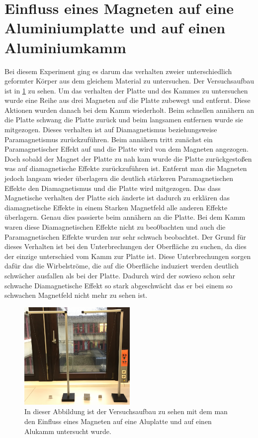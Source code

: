 \section{Einfluss eines Magneten auf eine Aluminiumplatte und auf einen Aluminiumkamm }\label{kap:Kamm_Platte}
Bei diesem Experiment ging es darum das verhalten zweier unterschiedlich geformter Körper aus dem gleichem Material zu untersuchen. Der Versuchsaufbau ist in \cref{fig:Alukamm} zu sehen.
Um das verhalten der Platte und des Kammes zu untersuchen wurde eine Reihe aus drei Magneten  auf die Platte zubewegt und entfernt. Diese Aktionen wurden danach bei dem Kamm wiederholt.
Beim schnellen annähern an die Platte schwang die Platte zurück und beim langsamen entfernen wurde sie mitgezogen.
Dieses verhalten ist auf Diamagnetismus beziehungsweise Paramagnetismus zurückzuführen. Beim annähern tritt zunächst ein Paramagnetischer Effekt auf und die Platte wird von dem Magneten angezogen. Doch sobald der Magnet der Platte zu nah kam wurde die Platte zurückgestoßen was auf diamagnetische Effekte zurückzuführen ist. Entfernt man die Magneten jedoch langsam wieder überlagern die deutlich stärkeren Paramagnetischen Effekte den Diamagnetismus und die Platte wird mitgezogen.
Das dass Magnetische verhalten der Platte sich änderte ist dadurch zu erklären das diamagnetische Effekte in einem Starken Magnetfeld alle anderen Effekte überlagern. Genau dies passierte beim annähern an die Platte.
Bei dem Kamm waren diese Diamagnetischen Effekte nicht zu beo0bachten und auch die Paramagnetischen Effekte wurden nur sehr schwach beobachtet. Der Grund für dieses Verhalten ist bei den Unterbrechungen der Oberfläche zu  suchen, da dies der einzige unterschied vom Kamm zur Platte ist. Diese Unterbrechungen sorgen dafür das die Wirbelströme, die auf die Oberfläche induziert werden deutlich schwächer ausfallen als bei der Platte.
Dadurch wird der sowieso schon sehr schwache Diamagnetische Effekt so stark abgeschwächt das er bei einem so schwachen Magnetfeld nicht mehr zu sehen ist.
\begin{figure}[h]
	\includegraphics[width=0.5\textwidth]{res/Alupendel.png}
	\caption{In dieser Abbildung ist der Versuchsaufbau zu sehen mit dem man den Einfluss eines Magneten auf eine Aluplatte und auf einen Alukamm untersucht wurde\protect\footnotemark.}
	\label{fig:Alukamm}
\end{figure}
